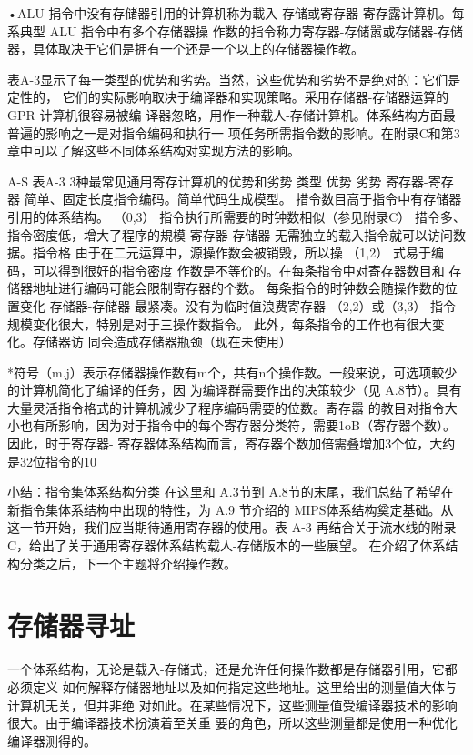 •ALU 捐令中没有存储器引用的计算机称为載入-存储或寄存器-寄存露计算机。每系典型 ALU 指令中有多个存储器操
作数的指令称力寄存器-存储嚣或存储器-存储器，具体取决于它们是拥有一个还是一个以上的存储器操作教。

表A-3显示了每一类型的优势和劣势。当然，这些优势和劣势不是绝对的：它们是定性的，
它们的实际影响取决于编译器和实现策略。采用存储器-存储器运算的GPR 计算机很容易被编
译器忽略，用作一种载人-存储计算机。体系结构方面最普遍的影响之一是对指令编码和执行一
项任务所需指令数的影响。在附录C和第3章中可以了解这些不同体系结构对实现方法的影响。

A-S
表A-3 3种最常见通用寄存计算机的优势和劣势
类型
优势
劣势
寄存器-寄存器
简单、固定长度指令编码。简单代码生成模型。 措令数目高于指令中有存储器引用的体系结构。
（0,3）
指令执行所需要的时钟数相似（参见附录C）
措令多、指令密度低，增大了程序的規模
寄存器-存储器
无需独立的载入指令就可以访问数据。指令格
由于在二元运算中，源操作数会被销毁，所以操
（1,2）
式易于编码，可以得到很好的指令密度
作数是不等价的。在每条指令中对寄存器数目和
存储器地址进行编码可能会限制寄存器的个数。
每条指令的时钟数会随操作数的位置变化
存储器-存储器 最紧凑。没有为临时值浪费寄存器
（2,2）或（3,3）
指令规模变化很大，特别是对于三操作数指令。
此外，每条指令的工作也有很大变化。存储器访
同会造成存储器瓶颈（现在未使用）


*符号（m.j）表示存储器操作数有m个，共有n个操作数。一般来说，可选项較少的计算机简化了编译的任务，因
为编译群需要作出的决策较少（见 A.8节）。具有大量灵活指令格式的计算机減少了程序编码需要的位数。寄存嚣
的教目对指令大小也有所影响，因为对于指令中的每个寄存器分类符，需要1oB（寄存器个数）。因此，时于寄存器-
寄存器体系结构而言，寄存器个数加倍需叠增加3个位，大约是32位指令的10%

小结：指令集体系结构分类
在这里和 A.3节到 A.8节的末尾，我们总结了希望在新指令集体系结构中出现的特性，为
A.9 节介绍的 MIPS体系结构奠定基础。从这一节开始，我们应当期待通用寄存器的使用。表
A-3 再结合关于流水线的附录C，给出了关于通用寄存器体系结构载人-存储版本的一些展望。
在介绍了体系结构分类之后，下一个主题将介绍操作数。

\section{存储器寻址}

一个体系结构，无论是载入-存储式，还是允许任何操作数都是存储器引用，它都必须定义
如何解释存储器地址以及如何指定这些地址。这里给出的测量值大体与计算机无关，但并非绝
对如此。在某些情况下，这些测量值受编译器技术的影响很大。由于编译器技术扮演着至关重
要的角色，所以这些测量都是使用一种优化编译器测得的。

